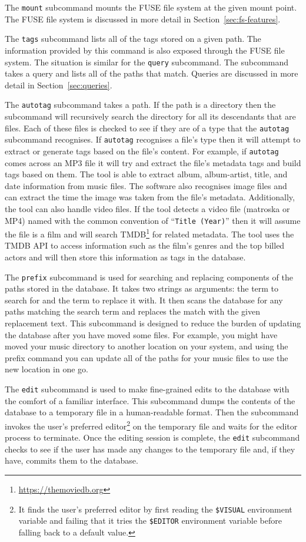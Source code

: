 The \texttt{mount} subcommand mounts the FUSE file system at the given mount
point. The FUSE file system is discussed in more detail in
Section~\ref{sec:fs-features}.

The \texttt{tags} subcommand lists all of the tags stored on a given path. The
information provided by this command is also exposed through the FUSE file
system. The situation is similar for the \texttt{query} subcommand. The
subcommand takes a query and lists all of the paths that match. Queries are
discussed in more detail in Section~\ref{sec:queries}.

The \texttt{autotag} subcommand takes a path. If the path is a directory then
the subcommand will recursively search the directory for all its descendants
that are files. Each of these files is checked to see if they are of a type
that the \texttt{autotag} subcommand recognises. If \texttt{autotag} recognises
a file's type then it will attempt to extract or generate tags based on the
file's content. For example, if \texttt{autotag} comes across an MP3 file it
will try and extract the file's metadata tags and build tags based on them. The
tool is able to extract album, album-artist, title, and date information from
music files. The software also recognises image files and can extract the time
the image was taken from the file's metadata. Additionally, the tool can also
handle video files. If the tool detects a video file (matroska or MP4) named
with the common convention of ``\texttt{Title (Year)}'' then it will assume the
file is a film and will search TMDB\footnote{\url{https://themoviedb.org}} for
related metadata. The tool uses the TMDB API to access information such as the
film's genres and the top billed actors and will then store this information as
tags in the database.

The \texttt{prefix} subcommand is used for searching and replacing components
of the paths stored in the database. It takes two strings as arguments: the
term to search for and the term to replace it with. It then scans the database
for any paths matching the search term and replaces the match with the given
replacement text. This subcommand is designed to reduce the burden of updating
the database after you have moved some files. For example, you might have moved
your music directory to another location on your system, and using the prefix
command you can update all of the paths for your music files to use the new
location in one go.

The \texttt{edit} subcommand is used to make fine-grained edits to the database
with the comfort of a familiar interface. This subcommand dumps the contents of
the database to a temporary file in a human-readable format. Then the
subcommand invokes the user's preferred editor\footnote{It finds the user's
preferred editor by first reading the \texttt{\$VISUAL} environment variable and
failing that it tries the \texttt{\$EDITOR} environment variable before falling
back to a default value.} on the temporary file and waits for the editor
process to terminate. Once the editing session is complete, the \texttt{edit}
subcommand checks to see if the user has made any changes to the temporary
file and, if they have, commits them to the database.

